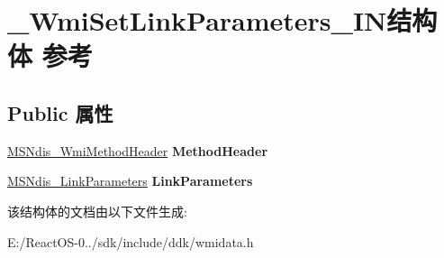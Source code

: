 \hypertarget{struct___wmi_set_link_parameters___i_n}{}\section{\+\_\+\+Wmi\+Set\+Link\+Parameters\+\_\+\+I\+N结构体 参考}
\label{struct___wmi_set_link_parameters___i_n}
\subsection*{Public 属性}
\begin{DoxyCompactItemize}
\item 
\mbox{\label{struct___wmi_set_link_parameters___i_n_a9404267a2f8606617adcd2b99a5962e6}} 
\hyperlink{struct___m_s_ndis___wmi_method_header}{M\+S\+Ndis\+\_\+\+Wmi\+Method\+Header} {\bfseries Method\+Header}
\item 
\mbox{\label{struct___wmi_set_link_parameters___i_n_abdaf284e3b81169463629ef6aeed898b}} 
\hyperlink{struct___m_s_ndis___link_parameters}{M\+S\+Ndis\+\_\+\+Link\+Parameters} {\bfseries Link\+Parameters}
\end{DoxyCompactItemize}


该结构体的文档由以下文件生成\+:\begin{DoxyCompactItemize}
\item 
E\+:/\+React\+O\+S-\/0../sdk/include/ddk/wmidata.\+h\end{DoxyCompactItemize}
